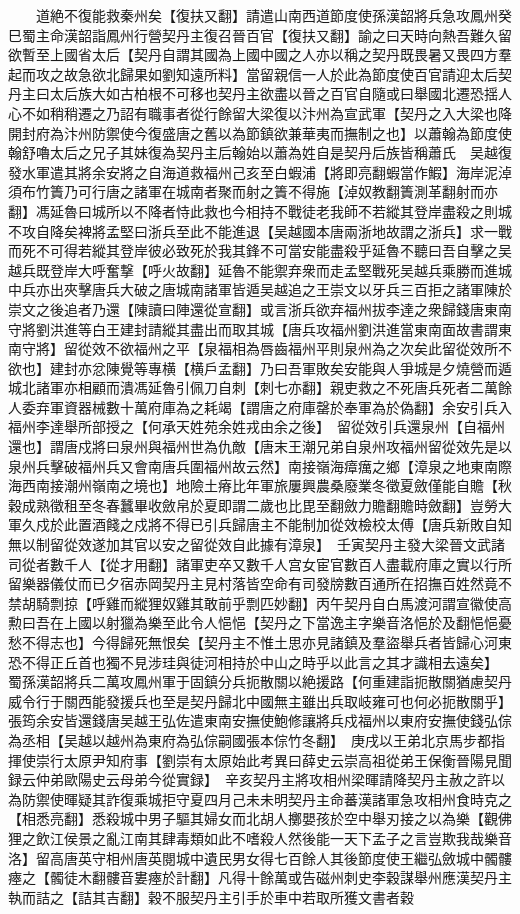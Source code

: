 　　道絶不復能救秦州矣【復扶又翻】請遣山南西道節度使孫漢韶將兵急攻鳳州癸巳蜀主命漢韶詣鳳州行營契丹主復召晉百官【復扶又翻】諭之曰天時向熱吾難久留欲暫至上國省太后【契丹自謂其國為上國中國之人亦以稱之契丹既畏暑又畏四方羣起而攻之故急欲北歸果如劉知遠所料】當留親信一人於此為節度使百官請迎太后契丹主曰太后族大如古柏根不可移也契丹主欲盡以晉之百官自隨或曰舉國北遷恐揺人心不如稍稍遷之乃詔有職事者從行餘留大梁復以汴州為宣武軍【契丹之入大梁也降開封府為汴州防禦使今復盛唐之舊以為節鎮欲兼華夷而撫制之也】以蕭翰為節度使翰舒嚕太后之兄子其妹復為契丹主后翰始以蕭為姓自是契丹后族皆稱蕭氏　吴越復發水軍遣其將余安將之自海道救福州己亥至白蝦浦【將即亮翻蝦當作鰕】海岸泥淖須布竹簀乃可行唐之諸軍在城南者聚而射之簀不得施【淖奴教翻簀測革翻射而亦翻】馮延魯曰城所以不降者恃此救也今相持不戰徒老我師不若縱其登岸盡殺之則城不攻自降矣裨將孟堅曰浙兵至此不能進退【吴越國本唐兩浙地故謂之浙兵】求一戰而死不可得若縱其登岸彼必致死於我其鋒不可當安能盡殺乎延魯不聽曰吾自擊之吴越兵既登岸大呼奮撃【呼火故翻】延魯不能禦弃衆而走孟堅戰死吴越兵乘勝而進城中兵亦出夾擊唐兵大破之唐城南諸軍皆遁吴越追之王崇文以牙兵三百拒之諸軍陳於崇文之後追者乃還【陳讀曰陣還從宣翻】或言浙兵欲弃福州拔李達之衆歸錢唐東南守將劉洪進等白王建封請縱其盡出而取其城【唐兵攻福州劉洪進當東南面故書謂東南守將】留從效不欲福州之平【泉福相為唇齒福州平則泉州為之次矣此留從效所不欲也】建封亦忿陳覺等專横【横戶孟翻】乃曰吾軍敗矣安能與人爭城是夕燒營而遁城北諸軍亦相顧而潰馮延魯引佩刀自刺【刺七亦翻】親吏救之不死唐兵死者二萬餘人委弃軍資器械數十萬府庫為之耗竭【謂唐之府庫罄於奉軍為於偽翻】余安引兵入福州李達舉所部授之【何承天姓苑余姓戎由余之後】　留從效引兵還泉州【自福州還也】謂唐戍將曰泉州與福州世為仇敵【唐末王潮兄弟自泉州攻福州留從效先是以泉州兵擊破福州兵又會南唐兵圍福州故云然】南接嶺海瘴癘之鄉【漳泉之地東南際海西南接潮州嶺南之境也】地險土瘠比年軍旅屢興農桑廢業冬徵夏斂僅能自贍【秋穀成熟徵租至冬春蠶畢收斂帛於夏即謂二歲也比毘至翻斂力贍翻贍時斂翻】豈勞大軍久戍於此置酒餞之戍將不得已引兵歸唐主不能制加從效檢校太傅【唐兵新敗自知無以制留從效遂加其官以安之留從效自此據有漳泉】　壬寅契丹主發大梁晉文武諸司從者數千人【從才用翻】諸軍吏卒又數千人宫女宦官數百人盡載府庫之實以行所留樂器儀仗而已夕宿赤岡契丹主見村落皆空命有司發牓數百通所在招撫百姓然竟不禁胡騎剽掠【呼雞而縱狸奴雞其敢前乎剽匹妙翻】丙午契丹自白馬渡河謂宣徽使高勲曰吾在上國以射獵為樂至此令人悒悒【契丹之下當逸主字樂音洛悒於及翻悒悒憂愁不得志也】今得歸死無恨矣【契丹主不惟土思亦見諸鎮及羣盜舉兵者皆歸心河東恐不得正丘首也獨不見涉珪與徒河相持於中山之時乎以此言之其才識相去遠矣】　蜀孫漢韶將兵二萬攻鳳州軍于固鎮分兵扼散關以絶援路【何重建詣扼散關猶慮契丹威令行于關西能發援兵也至是契丹歸北中國無主雖出兵取岐雍可也何必扼散關乎】　張筠余安皆還錢唐吴越王弘佐遣東南安撫使鮑修讓將兵戍福州以東府安撫使錢弘倧為丞相【吴越以越州為東府為弘倧嗣國張本倧竹冬翻】　庚戌以王弟北京馬步都指揮使崇行太原尹知府事【劉崇有太原始此考異曰薛史云崇高祖從弟王保衡晉陽見聞録云仲弟歐陽史云母弟今從實録】　辛亥契丹主將攻相州梁暉請降契丹主赦之許以為防禦使暉疑其詐復乘城拒守夏四月己未未明契丹主命蕃漢諸軍急攻相州食時克之【相悉亮翻】悉殺城中男子驅其婦女而北胡人擲嬰孩於空中舉刃接之以為樂【觀佛狸之飲江侯景之亂江南其肆毒類如此不嗜殺人然後能一天下孟子之言豈欺我哉樂音洛】留高唐英守相州唐英閱城中遺民男女得七百餘人其後節度使王繼弘斂城中髑髏瘞之【髑徒木翻髏音婁瘞於計翻】凡得十餘萬或告磁州刺史李穀謀舉州應漢契丹主執而詰之【詰其吉翻】穀不服契丹主引手於車中若取所獲文書者穀